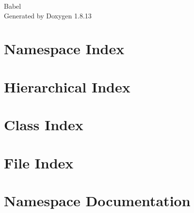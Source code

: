 \documentclass[twoside]{book}
\newcommand{\+}{\discretionary{\mbox{\scriptsize$\hookleftarrow$}}{}{}}
\newcommand{\clearemptydoublepage}{%
  \newpage{\pagestyle{empty}\cleardoublepage}%
}
\begin{document}
\hypersetup{pageanchor=false,
             bookmarksnumbered=true,
             pdfencoding=unicode
            }
\begin{titlepage}
\vspace*{7cm}
\begin{center}%
{\Large Babel }\\
\vspace*{1cm}
{\large Generated by Doxygen 1.8.13}\\
\end{center}
\end{titlepage}
\clearemptydoublepage
{}
\tableofcontents
\clearemptydoublepage
{}
\hypersetup{pageanchor=true}

\chapter{Namespace Index}

\chapter{Hierarchical Index}

\chapter{Class Index}

\chapter{File Index}

\chapter{Namespace Documentation}






\end{document}
